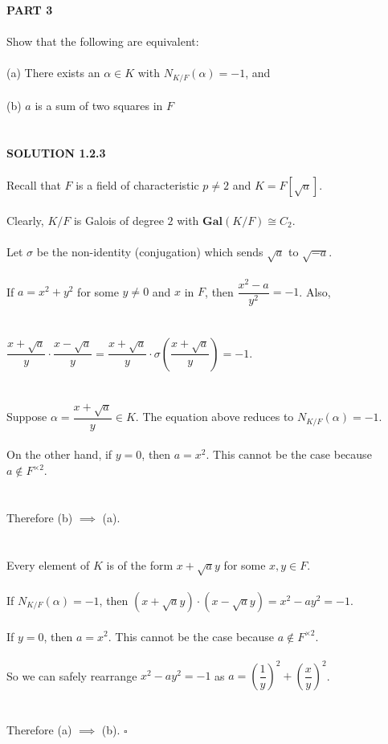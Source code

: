 \documentclass{article}
\begin{document}
\noindent \textbf{PART 3} \\\\
\indent Show that the following are equivalent: \\\\
\indent \indent (a) \indent There exists an $\alpha \in K$ with $N_{K/F}(\alpha) = -1$, and \\\\
\indent \indent (b) \indent $a$ is a sum of two squares in $F$ \\\\
\\
\textbf{SOLUTION 1.2.3} \\\\
\noindent Recall that $F$ is a field of characteristic $p \neq 2$ and $K = F[\sqrt{a}]$. \\\\
Clearly, $K/F$ is Galois of degree $2$ with $\textbf{Gal}(K/F) \cong C_2$. \\\\
Let $\sigma$ be the non-identity (conjugation) which sends $\sqrt{a}$ to $\sqrt{-a}$. \\\\
If $a = x^2 + y^2$ for some $y \neq 0$ and $x$ in $F$, then $\dfrac{x^2-a}{y^2} = -1$. Also, \\\\\\
\indent $\dfrac{x + \sqrt{a}}{y} \cdot \dfrac{x - \sqrt{a}}{y} =\dfrac{x + \sqrt{a}}{y} \cdot \sigma(\dfrac{x + \sqrt{a}}{y}) = -1$. \\\\\\
Suppose $\alpha = \dfrac{x + \sqrt{a}}{y} \in K$. The equation above reduces to $N_{K/F}(\alpha) = -1$. \\\\
On the other hand, if $y = 0$, then $a = x^2$. This cannot be the case because $a \notin F^{\times2}$. \\\\\\
Therefore (b) $\implies$ (a). \\\\\\
Every element of $K$ is of the form $x + \sqrt{a} y$ for some $x, y \in F$. \\\\
If $N_{K/F}(\alpha) = -1$, then $(x + \sqrt{a}y) \cdot (x - \sqrt{a}y) = x^2 - ay^2 = -1$. \\\\
If $y = 0$, then $a = x^2$. This cannot be the case because $a \notin F^{\times2}$. \\\\
So we can safely rearrange $x^2 - ay^2 = -1$ as $a = \left(\dfrac{1}{y}\right)^2 + \left(\dfrac{x}{y}\right)^2$. \\\\\\
Therefore (a) $\implies$ (b). $\square$
\pagebreak
\end{document}
